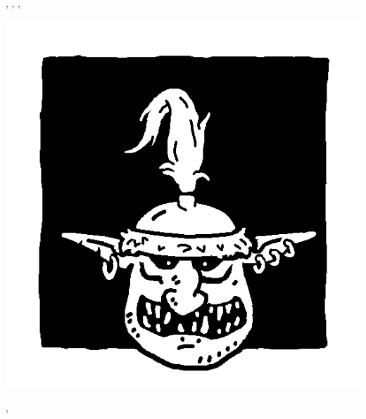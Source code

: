 \begin{multicols}{3}
\begin{center}
\frenzy{}, \unruly{}, \borntofight{}, 
\end{center}

\end{multicols}

\begin{multicols}{3}\raggedcolumns

\begin{center}
\includegraphics[width=\logosize]{pics/commongoblin.png}
\vspace*{-1cm}\subsubtitle{\commongoblin}

\unruly{}, \insignificant{}
\end{center}

\columnbreak


\end{multicols}
